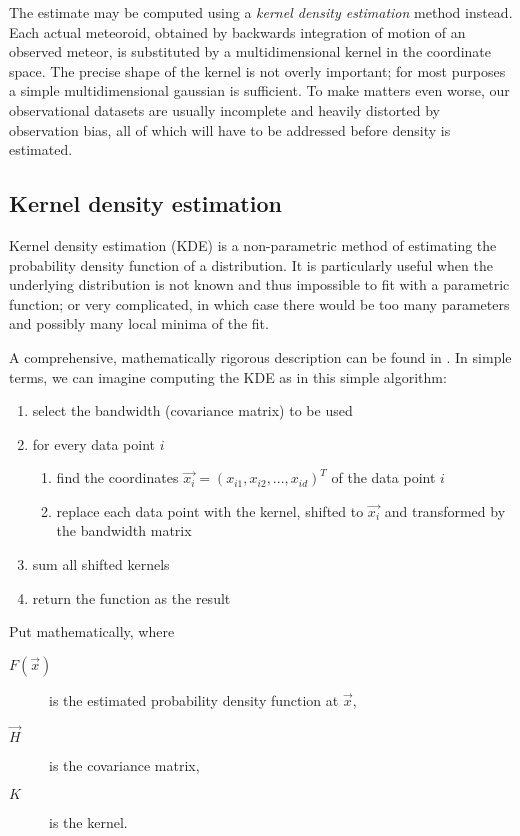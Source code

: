    The estimate may be computed using a \emph{kernel density estimation} method instead.
    Each actual meteoroid, obtained by backwards integration of motion of an observed meteor,
    is substituted by a multidimensional kernel in the coordinate space. The precise shape of the kernel
    is not overly important; for most purposes a simple multidimensional gaussian is sufficient.
    To make matters even worse, our observational datasets are usually incomplete
    and heavily distorted by observation bias, all of which will have to be addressed before density is estimated.

    \subsection{Kernel density estimation} \label{mmk}
        Kernel density estimation (KDE) is a non-parametric method of estimating the probability density function
        of a distribution. It is particularly useful when the underlying distribution is not known and thus impossible
        to fit with a parametric function; or very complicated, in which case there would be too many parameters
        and possibly many local minima of the fit.

        A comprehensive, mathematically rigorous description can be found in \citep{hwang+1994}.
        In simple terms, we can imagine computing the KDE as in this simple algorithm:
        \begin{enumerate}
            \item select the bandwidth (covariance matrix) to be used
            \item for every data point $i$
                \begin{enumerate}[label=\arabic*.]
                \item find the coordinates $\vec{x_i} = (x_{i1}, x_{i2}, ..., x_{id})^T$ of the data point $i$
                \item replace each data point with the kernel, shifted to $\vec{x_i}$ and transformed by the bandwidth matrix
            \end{enumerate}
            \item sum all shifted kernels
            \item return the function as the result
        \end{enumerate}

        Put mathematically,
        where
        \begin{description}
            \item[$F(\vec{x})$]
                is the estimated probability density function at $\vec{x}$,
            \item[$\vec{H}$]
                is the covariance matrix,
            \item[$K$]
                is the kernel.
        \end{description}

